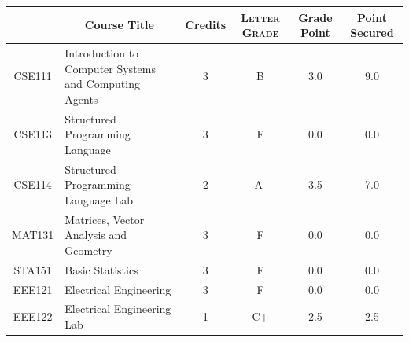 \documentclass[11pt]{article}
\newcommand*{\numtwo}[1]{\pgfmathprintnumber[
                    fixed, precision=2, fixed zerofill=true]{#1}}
\begin{document}
                \begin{center}
                    \renewcommand{\arraystretch}{1.08}
                    
                \begin{tabular}{|c|l|c|>{\scshape}c|c|c|}
                \hline  \rule[-1ex]{0pt}{3.5ex} {\centering{\bf Course Code}} &  \multicolumn{1}{c|}{\textbf{Course Title}}  & {\bf Credits} & {\bf Letter Grade} & {\bf Grade Point} & {\bf Point Secured}  \\ 
                \hline   CSE111 &  Introduction to Computer Systems and Computing Agents		 & 3 & B & 3.0 & 9.0 \\ %
                \hline   CSE113 &  Structured Programming Language		 & 3 & F & 0.0 & 0.0 \\ %
                \hline   CSE114 &  Structured Programming Language Lab		 & 2 & A- & 3.5 & 7.0 \\ %
                \hline   MAT131 &  Matrices, Vector Analysis and Geometry		 & 3 & F & 0.0 & 0.0 \\ %
                \hline   STA151 &  Basic Statistics		 & 3 & F & 0.0 & 0.0 \\ %
                \hline   EEE121 &  Electrical Engineering		 & 3 & F & 0.0 & 0.0 \\ %
                \hline   EEE122 &  Electrical Engineering Lab		 & 1 & C+ & 2.5 & 2.5 \\ %

\hline                %
                \end{tabular}
                \end{center}
                \renewcommand{\arraystretch}{1.03}
\end{document}
